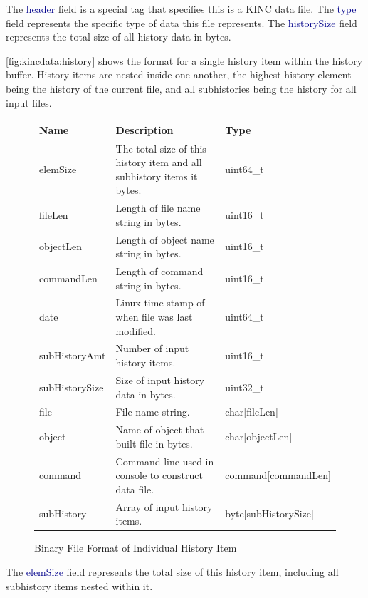\documentclass[10pt]{article}
\providecommand{\h}[1]{\textcolor{darkblue}{#1}}
\begin{document}
The \h{header} field is a special tag that specifies this is a KINC data file. 
The \h{type} field represents the specific type of data this file represents. 
The \h{historySize} field represents the total size of all history data in 
bytes.

\autoref{fig:kincdata:history} shows the format for a single history item 
within the history buffer. History items are nested inside one another, the 
highest history element being the history of the current file, and all 
subhistories being the history for all input files.

\begin{figure}[H]
\begin{mdframed}[style=btable]
\begin{tabularx}{\textwidth}{|l|X|l|}
\hline
\textbf{Name} & \textbf{Description} & \textbf{Type} \\
\hline
elemSize & The total size of this history item and all subhistory items it 
bytes. & uint64\_t \\
\hline
fileLen & Length of file name string in bytes. & uint16\_t \\
\hline
objectLen & Length of object name string in bytes. & uint16\_t \\
\hline
commandLen & Length of command string in bytes. & uint16\_t \\
\hline
date & Linux time-stamp of when file was last modified. & uint64\_t \\
\hline
subHistoryAmt & Number of input history items. & uint16\_t \\
\hline
subHistorySize & Size of input history data in bytes. & uint32\_t \\
\hline
file & File name string. & char[fileLen] \\
\hline
object & Name of object that built file in bytes. & char[objectLen] \\
\hline
command & Command line used in console to construct data file. & 
command[commandLen] \\
\hline
subHistory & Array of input history items. & byte[subHistorySize] \\
\hline
\end{tabularx}
\end{mdframed}
\caption{Binary File Format of Individual History Item}
\label{fig:kincdata:history}
\end{figure}

The \h{elemSize} field represents the total size of this history item, 
including all subhistory items nested within it.
\end{document}
